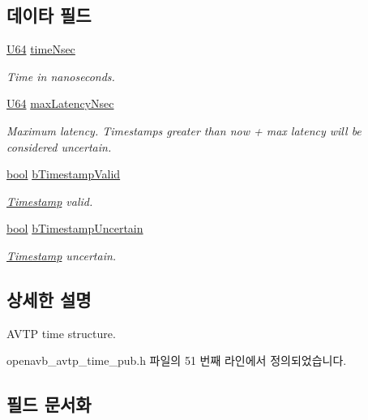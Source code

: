 \subsection*{데이타 필드}
\begin{DoxyCompactItemize}
\item 
\hyperlink{openavb__types__base__pub_8h_a25809e0734a149248fcf5831efa4e33d}{U64} \hyperlink{structavtp__time__t_affd0c73d1b4a5fe0cfff000872016eac}{time\+Nsec}
\begin{DoxyCompactList}\small\item\em Time in nanoseconds. \end{DoxyCompactList}\item 
\hyperlink{openavb__types__base__pub_8h_a25809e0734a149248fcf5831efa4e33d}{U64} \hyperlink{structavtp__time__t_a4f0c56f80049057fe9f41d4b15a3d127}{max\+Latency\+Nsec}
\begin{DoxyCompactList}\small\item\em Maximum latency. Timestamps greater than now + max latency will be considered uncertain. \end{DoxyCompactList}\item 
\hyperlink{avb__gptp_8h_af6a258d8f3ee5206d682d799316314b1}{bool} \hyperlink{structavtp__time__t_a0f80bf7d63fada1825c25ed77cc43848}{b\+Timestamp\+Valid}
\begin{DoxyCompactList}\small\item\em \hyperlink{class_timestamp}{Timestamp} valid. \end{DoxyCompactList}\item 
\hyperlink{avb__gptp_8h_af6a258d8f3ee5206d682d799316314b1}{bool} \hyperlink{structavtp__time__t_afc9066510178b2c6faf69cf4330e79d8}{b\+Timestamp\+Uncertain}
\begin{DoxyCompactList}\small\item\em \hyperlink{class_timestamp}{Timestamp} uncertain. \end{DoxyCompactList}\end{DoxyCompactItemize}


\subsection{상세한 설명}
A\+V\+TP time structure. 

openavb\+\_\+avtp\+\_\+time\+\_\+pub.\+h 파일의 51 번째 라인에서 정의되었습니다.



\subsection{필드 문서화}
